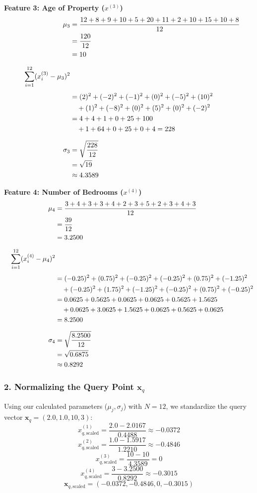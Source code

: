 \documentclass[12pt]{article}
\newcommand{\MVec}[1]{\mathbf{#1}}
\begin{document}
\noindent\textbf{Feature 3: Age of Property ($x^{(3)}$)}
\begin{align*}
    \mu_3 &= \frac{12 + 8 + 9 + 10 + 5 + 20 + 11 + 2 + 10 + 15 + 10 + 8}{12} \\
          &= \frac{120}{12}\\
          &= 10 \\[6pt]
    \hspace*{1em}\sum_{i=1}^{12} (x_i^{(3)} - \mu_3)^2 & \\[4pt]
            &= (2)^2 + (-2)^2 + (-1)^2 + (0)^2 + (-5)^2 + (10)^2 \\
            &\quad + (1)^2 + (-8)^2 + (0)^2 + (5)^2 + (0)^2 + (-2)^2 \\
            &= 4 + 4 + 1 + 0 + 25 + 100 \\
            &\quad + 1 + 64 + 0 + 25 + 0 + 4 = 228 \\[6pt]
    \sigma_3 &= \sqrt{\frac{228}{12}}\\
            &= \sqrt{19} \\
            &\approx 4.3589
\end{align*}

\noindent\textbf{Feature 4: Number of Bedrooms ($x^{(4)}$)}
\begin{align*}
    \mu_4 &= \frac{3 + 4 + 3 + 3 + 4 + 2 + 3 + 5 + 2 + 3 + 4 + 3}{12}\\
          &= \frac{39}{12} \\
          &= 3.2500 \\[6pt]
    \hspace*{1em}\sum_{i=1}^{12} (x_i^{(4)} - \mu_4)^2 & \\[4pt]
        &=(-0.25)^2 + (0.75)^2 + (-0.25)^2 + (-0.25)^2 + (0.75)^2 + (-1.25)^2 \\
        &\quad + (-0.25)^2 + (1.75)^2 + (-1.25)^2 + (-0.25)^2 + (0.75)^2 + (-0.25)^2 \\
        &= 0.0625 + 0.5625 + 0.0625 + 0.0625 + 0.5625 + 1.5625 \\
        &\quad + 0.0625 + 3.0625 + 1.5625 + 0.0625 + 0.5625 + 0.0625 \\
        &= 8.2500 \\[6pt]
    \sigma_4 &= \sqrt{\frac{8.2500}{12}}\\
             &= \sqrt{0.6875}\\
             & \approx 0.8292
\end{align*}

\subsubsection*{2. Normalizing the Query Point $\MVec{x}_q$}
Using our calculated parameters ($\mu_j, \sigma_j$) with $N=12$, we standardize the query vector $\MVec{x}_q = (2.0, 1.0, 10, 3)$:
\[
    x_{q,\text{scaled}}^{(1)} = \frac{2.0 - 2.0167}{0.4488} \approx -0.0372
\]
\[
    x_{q,\text{scaled}}^{(2)} = \frac{1.0 - 1.5917}{1.2210} \approx -0.4846
\]
\[
    x_{q,\text{scaled}}^{(3)} = \frac{10 - 10}{4.3589} = 0
\]
\[
    x_{q,\text{scaled}}^{(4)} = \frac{3 - 3.2500}{0.8292} \approx -0.3015
\]
\[
    \MVec{x}_{q,\text{scaled}} = (-0.0372, -0.4846, 0, -0.3015)
\]
\end{document}
